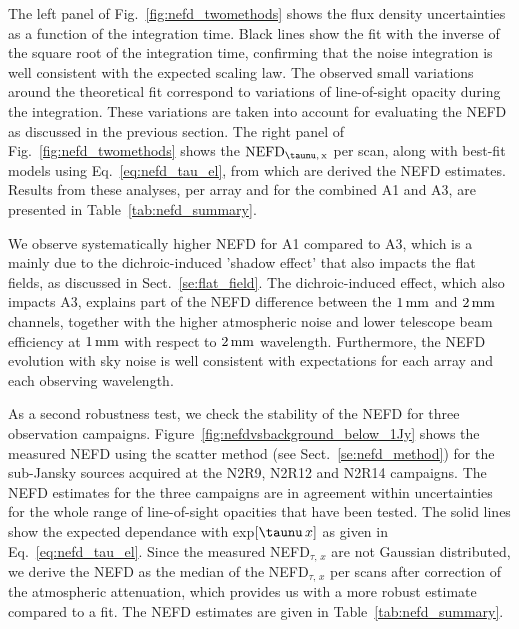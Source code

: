 The left panel of Fig.~\ref{fig:nefd_twomethods} shows the flux density
uncertainties as a function of the integration time. Black lines show
the fit with the inverse of the square root of the integration time,
confirming that the noise integration is well consistent with the expected
scaling law. The observed small variations around the theoretical fit
correspond to variations of line-of-sight opacity during the
integration. These variations are taken into account for evaluating the NEFD as
discussed in the previous section. The right panel of Fig.~\ref{fig:nefd_twomethods} shows the
$\rm{NEFD}_{\taunu,\, x}$ per scan, along with best-fit models using
Eq.~\ref{eq:nefd_tau_el}, from which are derived the \rm{NEFD} estimates. 
Results from these analyses, per array and for the
combined A1 and A3, are presented in Table~\ref{tab:nefd_summary}.

We observe systematically higher NEFD for A1 compared to A3, which is a mainly
due to the dichroic-induced 'shadow effect' that also impacts the flat fields,
as discussed in Sect.~\ref{se:flat_field}.  The dichroic-induced effect, which
also impacts A3, explains part of the NEFD difference between the $1\, \rm{mm}$
and $2\, \rm{mm}$ channels, together with the higher atmospheric noise and lower
telescope beam efficiency at $1\, \rm{mm}$ with respect to $2\,\rm{mm}$
wavelength.  Furthermore, the NEFD evolution with sky noise is well
consistent with expectations for each array and each observing wavelength.

As a second robustness test, we check the stability of the NEFD for
three observation campaigns. Figure~\ref{fig:nefdvsbackground_below_1Jy} shows the
measured NEFD using the scatter method (see Sect.~\ref{se:nefd_method}) for the
sub-Jansky sources acquired at the N2R9, N2R12 and N2R14
campaigns. The NEFD estimates for the
three campaigns are in agreement within uncertainties for the whole
range of line-of-sight opacities that have been tested.
The solid lines show the expected dependance with
exp${[\taunu\,x]}$ as given in Eq.~\ref{eq:nefd_tau_el}. %
Since the measured NEFD$_{\tau,\, x}$ are not Gaussian distributed, we
derive the NEFD as the median of the NEFD$_{\tau,\, x}$
per scans after correction of the atmospheric attenuation, which provides us
with a more robust estimate compared to a fit. The NEFD estimates
are given in Table~\ref{tab:nefd_summary}.

